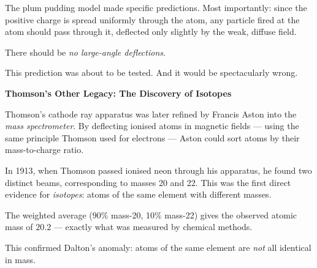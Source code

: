 \documentclass[12pt, a4paper]{book}
\theoremstyle{definition}
\begin{document}
\begin{center}
\end{center}

\vspace{0.5em}

The plum pudding model made specific predictions.
Most importantly: since the positive charge is spread uniformly
through the atom, any particle fired at the atom should
pass through it, deflected only slightly by the weak,
diffuse field.

There should be \emph{no large-angle deflections}.

This prediction was about to be tested.
And it would be spectacularly wrong.

\begin{historybox}
\textbf{Thomson's Other Legacy: The Discovery of Isotopes}

Thomson's cathode ray apparatus was later refined by Francis Aston
into the \emph{mass spectrometer}.
By deflecting ionised atoms in magnetic fields ---
using the same principle Thomson used for electrons ---
Aston could sort atoms by their mass-to-charge ratio.

In 1913, when Thomson passed ionised neon through his apparatus,
he found two distinct beams, corresponding to masses 20 and 22.
This was the first direct evidence for \emph{isotopes}:
atoms of the same element with different masses.

The weighted average (90\% mass-20, 10\% mass-22) gives
the observed atomic mass of $20.2$ --- exactly what was
measured by chemical methods.

This confirmed Dalton's anomaly: atoms of the same element
are \emph{not} all identical in mass.
\end{historybox}
\end{document}
